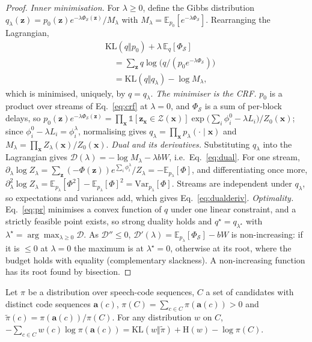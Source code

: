 \begin{proof}
\emph{Inner minimisation.} For $\lambda\ge0$, define the Gibbs distribution
$q_\lambda(\bm{z})=p_0(\bm{z})e^{-\lambda\Phi_\mathcal{S}(\bm{z})}/M_\lambda$ with $M_\lambda=\mathbb{E}_{p_0}[e^{-\lambda\Phi_\mathcal{S}}]$.
Rearranging the Lagrangian,
\[
\begin{aligned}
&\mathrm{KL}(q\Vert p_0)+\lambda\,\mathbb{E}_q[\Phi_\mathcal{S}]\\
&\quad=\textstyle\sum_{\bm{z}}q\log\big(q/(p_0e^{-\lambda\Phi_\mathcal{S}})\big)\\
&\quad=\mathrm{KL}(q\Vert q_\lambda)-\log M_\lambda ,
\end{aligned}
\]
which is minimised, uniquely, by $q=q_\lambda$.
\emph{The minimiser is the CRF.} $p_0$ is a product over streams of Eq.~\eqref{eq:crf} at $\lambda=0$, and
$\Phi_\mathcal{S}$ is a sum of per-block delays, so
$p_0(\bm{z})e^{-\lambda\Phi_\mathcal{S}(\bm{z})}=\prod_{\bm{x}}\mathds{1}[\bm{z}_{\bm{x}}\in\mathcal{Z}(\bm{x})]\exp\big(\sum_i\phi^0_i-\lambda L_i\big)/Z_0(\bm{x})$;
since $\phi^0_i-\lambda L_i=\phi^\lambda_i$, normalising gives $q_\lambda=\prod_{\bm{x}}p_\lambda(\cdot\mid\bm{x})$ and
$M_\lambda=\prod_{\bm{x}}Z_\lambda(\bm{x})/Z_0(\bm{x})$.
\emph{Dual and its derivatives.} Substituting $q_\lambda$ into the Lagrangian gives
$\mathcal{D}(\lambda)=-\log M_\lambda-\lambda bW$, i.e.\ Eq.~\eqref{eq:dual}. For one stream,
$\partial_\lambda\log Z_\lambda=\sum_{\bm{z}}(-\Phi(\bm{z}))e^{\sum_i\phi^\lambda_i}/Z_\lambda=-\mathbb{E}_{p_\lambda}[\Phi]$, and
differentiating once more, $\partial^2_\lambda\log Z_\lambda=\mathbb{E}_{p_\lambda}[\Phi^2]-\mathbb{E}_{p_\lambda}[\Phi]^2=\mathrm{Var}_{p_\lambda}[\Phi]$.
Streams are independent under $q_\lambda$, so expectations and variances add, which gives Eq.~\eqref{eq:dualderiv}.
\emph{Optimality.} Eq.~\eqref{eq:pr} minimises a convex function of $q$ under one linear constraint, and a strictly
feasible point exists, so strong duality holds and $q^\star=q_{\lambda^\star}$ with $\lambda^\star=\arg\max_{\lambda\ge0}\mathcal{D}$.
As $\mathcal{D}''\le0$, $\mathcal{D}'(\lambda)=\mathbb{E}_{p_\lambda}[\Phi_\mathcal{S}]-bW$ is non-increasing: if it is
$\le0$ at $\lambda=0$ the maximum is at $\lambda^\star=0$, otherwise at its root, where the budget holds with equality
(complementary slackness). A non-increasing function has its root found by bisection.
\end{proof}

\begin{proposition}
\label{prop:distill}
Let $\pi$ be a distribution over speech-code sequences, $C$ a set of candidates with distinct code sequences
$\bm{a}(c)$, $\pi(C)=\sum_{c\in C}\pi(\bm{a}(c))>0$ and $\tilde{\pi}(c)=\pi(\bm{a}(c))/\pi(C)$. For any distribution $w$
on $C$,
$-\sum_{c\in C}w(c)\log\pi(\bm{a}(c))=\mathrm{KL}(w\Vert\tilde{\pi})+\mathrm{H}(w)-\log\pi(C)$.
\end{proposition}

